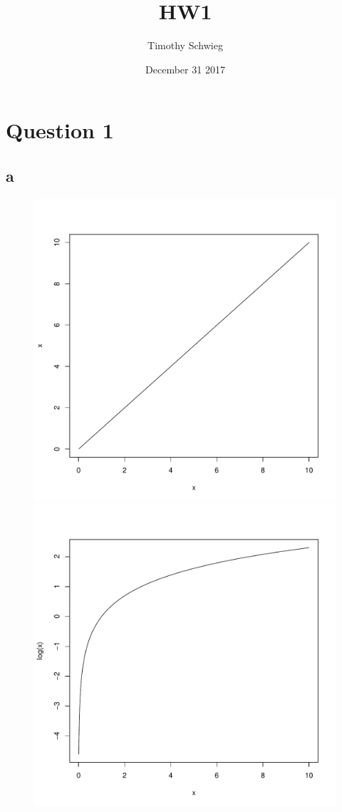 \documentclass[10pt,letterpaper]{paper}
\title{ HW1  }
\author{ Timothy Schwieg }
\date{ December 31 2017 }
\begin{document}
\maketitle

\section*{Question 1}

\subsection*{a}

\begin{figure}[H]
  \centering
  \includegraphics[scale=.3]{Question1a.pdf}
  \includegraphics[scale=.3]{Question1b.pdf}
  \caption{\label{fig:label} }
\end{figure}
\end{document}
